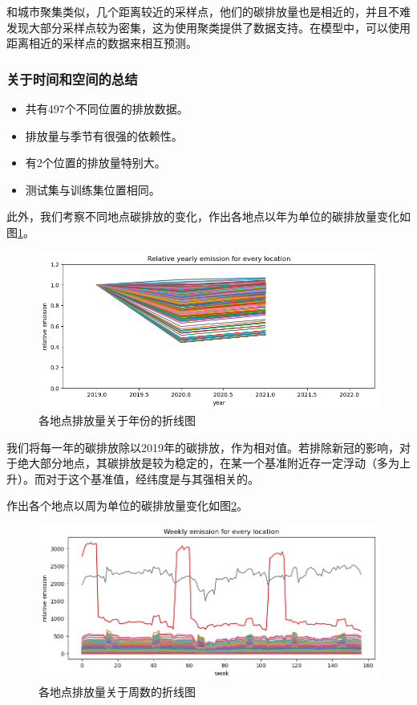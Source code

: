 \documentclass{ctexart}
\begin{document}
和城市聚集类似，几个距离较近的采样点，他们的碳排放量也是相近的，并且不难发现大部分采样点较为密集，这为使用聚类提供了数据支持。在模型中，可以使用距离相近的采样点的数据来相互预测。

\subsubsection{关于时间和空间的总结}

\begin{itemize}
      \item 共有497个不同位置的排放数据。
      \item 排放量与季节有很强的依赖性。
      \item 有2个位置的排放量特别大。
      \item 测试集与训练集位置相同。
\end{itemize}

此外，我们考察不同地点碳排放的变化，作出各地点以年为单位的碳排放量变化如图\ref{fig:5}。

\begin{figure}[H]
      \centering
      \includegraphics[width=1\textwidth]{output5.png}
      \caption{\label{fig:5}各地点排放量关于年份的折线图}
\end{figure}

我们将每一年的碳排放除以2019年的碳排放，作为相对值。若排除新冠的影响，对于绝大部分地点，其碳排放是较为稳定的，在某一个基准附近存一定浮动（多为上升）。而对于这个基准值，经纬度是与其强相关的。

作出各个地点以周为单位的碳排放量变化如图\ref{fig:8}。

\begin{figure}[H]
      \centering
      \includegraphics[width=1\textwidth]{output8.png}
      \caption{\label{fig:8}各地点排放量关于周数的折线图}
\end{figure}
\end{document}
